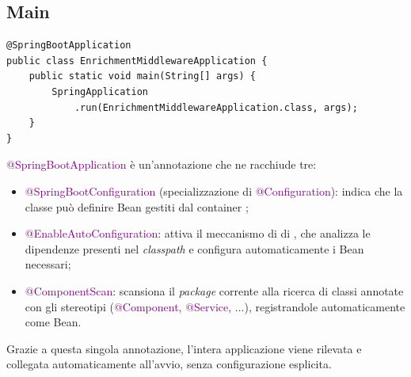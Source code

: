 \subsection{Main}
\begin{codelisting}[H]
\begin{verbatim}
@SpringBootApplication
public class EnrichmentMiddlewareApplication {
    public static void main(String[] args) {
        SpringApplication
            .run(EnrichmentMiddlewareApplication.class, args);
    }
}
\end{verbatim}
\caption{EnrichmentMiddlewareApplication}
\end{codelisting}
\noindent
\textcolor{purple}{@SpringBootApplication} è un'annotazione che ne racchiude tre:
\begin{itemize}
    \item \textcolor{purple}{@SpringBootConfiguration} (specializzazione di \textcolor{purple}{@Configuration}): indica che la classe può definire \gls{Bean} gestiti dal container ;
    \item \textcolor{purple}{@EnableAutoConfiguration}: attiva il meccanismo di \textit{} di , che analizza le dipendenze presenti nel \textit{classpath} e configura automaticamente i \gls{Bean} necessari;
    \item \textcolor{purple}{@ComponentScan}: scansiona il \textit{package} corrente alla ricerca di classi annotate con gli stereotipi (\textcolor{purple}{@Component}, \textcolor{purple}{@Service}, ...), registrandole automaticamente come \gls{Bean}.
\end{itemize}
Grazie a questa singola annotazione, l'intera applicazione viene rilevata e collegata automaticamente all'avvio, senza configurazione esplicita.

\newpage
